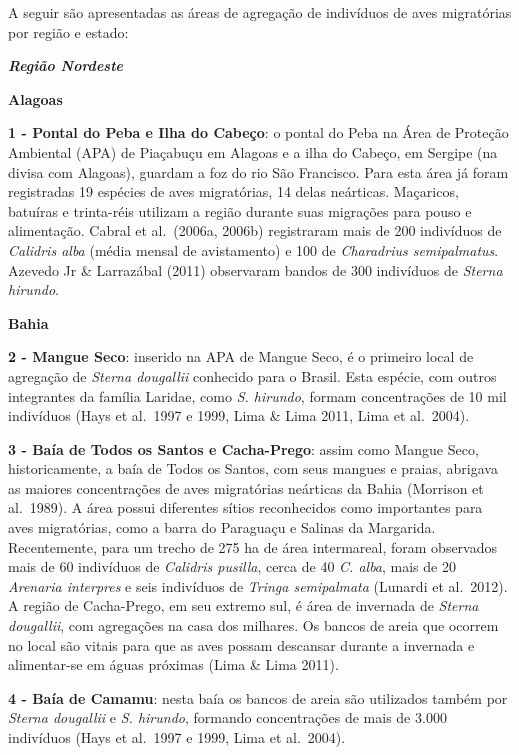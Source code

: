 \documentclass[
  oneside]{scrbook}
\begin{document}
A seguir são apresentadas as áreas de agregação de indivíduos de aves migratórias por região e estado:

\textbf{\emph{Região Nordeste}}

\textbf{Alagoas}

\textbf{1 - Pontal do Peba e Ilha do Cabeço}: o pontal do Peba na Área de Proteção Ambiental (APA) de Piaçabuçu em Alagoas e a ilha do Cabeço, em Sergipe (na divisa com Alagoas), guardam a foz do rio São Francisco. Para esta área já foram registradas 19 espécies de aves migratórias, 14 delas neárticas. Maçaricos, batuíras e trinta-réis utilizam a região durante suas migrações para pouso e alimentação. Cabral et al.~(2006a, 2006b) registraram mais de 200 indivíduos de \emph{Calidris alba} (média mensal de avistamento) e 100 de \emph{Charadrius semipalmatus}. Azevedo Jr \& Larrazábal (2011) observaram bandos de 300 indivíduos de \emph{Sterna hirundo}.

\textbf{Bahia}

\textbf{2 - Mangue Seco}: inserido na APA de Mangue Seco, é o primeiro local de agregação de \emph{Sterna dougallii} conhecido para o Brasil. Esta espécie, com outros integrantes da família Laridae, como \emph{S. hirundo}, formam concentrações de 10 mil indivíduos (Hays et al.~1997 e 1999, Lima \& Lima 2011, Lima et al.~2004).

\textbf{3 - Baía de Todos os Santos e Cacha-Prego}: assim como Mangue Seco, historicamente, a baía de Todos os Santos, com seus mangues e praias, abrigava as maiores concentrações de aves migratórias neárticas da Bahia (Morrison et al.~1989). A área possui diferentes sítios reconhecidos como importantes para aves migratórias, como a barra do Paraguaçu e Salinas da Margarida. Recentemente, para um trecho de 275 ha de área intermareal, foram observados mais de 60 indivíduos de \emph{Calidris pusilla}, cerca de 40 \emph{C. alba}, mais de 20 \emph{Arenaria interpres} e seis indivíduos de \emph{Tringa semipalmata} (Lunardi et al.~2012). A região de Cacha-Prego, em seu extremo sul, é área de invernada de \emph{Sterna dougallii}, com agregações na casa dos milhares. Os bancos de areia que ocorrem no local são vitais para que as aves possam descansar durante a invernada e alimentar-se em águas próximas (Lima \& Lima 2011).

\textbf{4 - Baía de Camamu}: nesta baía os bancos de areia são utilizados também por \emph{Sterna dougallii} e \emph{S. hirundo}, formando concentrações de mais de 3.000 indivíduos (Hays et al.~1997 e 1999, Lima et al.~2004).
\end{document}
